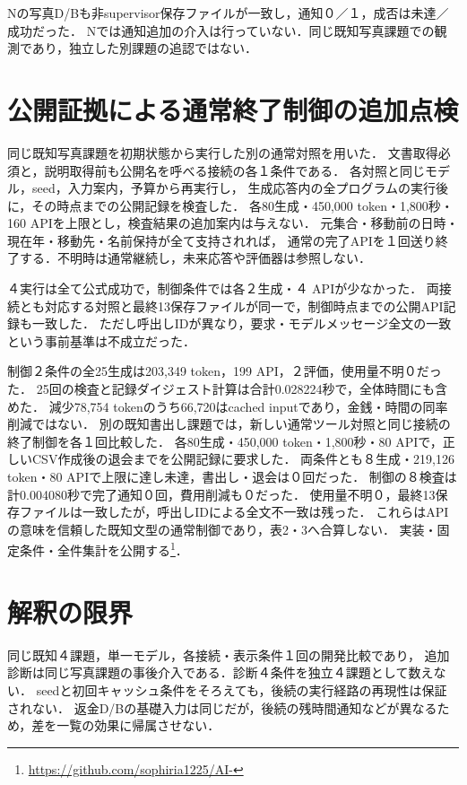\documentclass[uplatex,a4paper,twocolumn,10pt]{jsarticle}
\begin{document}
Nの写真D/Bも非supervisor保存ファイルが一致し，通知０／１，成否は未達／成功だった．
Nでは通知追加の介入は行っていない．同じ既知写真課題での観測であり，独立した別課題の追認ではない．

\section{公開証拠による通常終了制御の追加点検}
同じ既知写真課題を初期状態から実行した別の通常対照を用いた．
文書取得必須と，説明取得前も公開名を呼べる接続の各１条件である．
各対照と同じモデル，seed，入力案内，予算から再実行し，
生成応答内の全プログラムの実行後に，その時点までの公開記録を検査した．
各80生成・450,000 token・1,800秒・160 APIを上限とし，検査結果の追加案内は与えない．
元集合・移動前の日時・現在年・移動先・名前保持が全て支持されれば，
通常の完了APIを１回送り終了する．不明時は通常継続し，未来応答や評価器は参照しない．

４実行は全て公式成功で，制御条件では各２生成・４ APIが少なかった．
両接続とも対応する対照と最終13保存ファイルが同一で，制御時点までの公開API記録も一致した．
ただし呼出しIDが異なり，要求・モデルメッセージ全文の一致という事前基準は不成立だった．

制御２条件の全25生成は203,349 token，199 API，２評価，使用量不明０だった．
25回の検査と記録ダイジェスト計算は合計0.028224秒で，全体時間にも含めた．
減少78,754 tokenのうち66,720はcached inputであり，金銭・時間の同率削減ではない．
別の既知書出し課題では，新しい通常ツール対照と同じ接続の終了制御を各１回比較した．
各80生成・450,000 token・1,800秒・80 APIで，正しいCSV作成後の退会までを公開記録に要求した．
両条件とも８生成・219,126 token・80 APIで上限に達し未達，書出し・退会は０回だった．
制御の８検査は計0.004080秒で完了通知０回，費用削減も０だった．
使用量不明０，最終13保存ファイルは一致したが，呼出しIDによる全文不一致は残った．
これらはAPIの意味を信頼した既知文型の通常制御であり，表2・3へ合算しない．
実装・固定条件・全件集計を公開する\footnote{\url{https://github.com/sophiria1225/AI-}}．

\section{解釈の限界}
同じ既知４課題，単一モデル，各接続・表示条件１回の開発比較であり，
追加診断は同じ写真課題の事後介入である．診断４条件を独立４課題として数えない．
seedと初回キャッシュ条件をそろえても，後続の実行経路の再現性は保証されない．
返金D/Bの基礎入力は同じだが，後続の残時間通知などが異なるため，差を一覧の効果に帰属させない．
\end{document}
